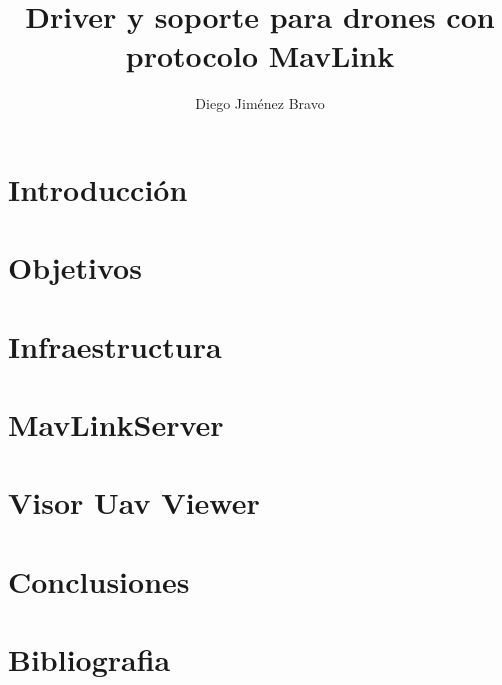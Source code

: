 \documentclass{new_cit_thesis}
\begin{document}
\title{Driver y soporte para drones con protocolo MavLink}
\author{Diego Jiménez Bravo}
\address{Tutor: Jose Maria Cañas Plaza}                     
\copyyear{\the\year}                               
\pubnum{}                                          
\dedication{}  		   


\maketitle
\cleardoublepage


\cleardoublepage


\cleardoublepage


\cleardoublepage


\cleardoublepage
\pagestyle{plain}
\chapter{Introducción}


\cleardoublepage
\chapter{Objetivos}


\cleardoublepage
\chapter{Infraestructura}


\cleardoublepage
\chapter{MavLinkServer}


\cleardoublepage
\chapter{Visor Uav Viewer}


\cleardoublepage
\chapter{Conclusiones}


\cleardoublepage
\chapter{Bibliografia}

\end{document}
